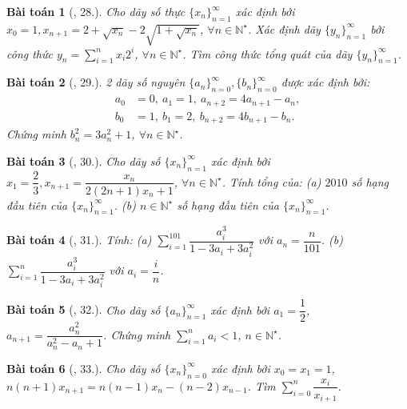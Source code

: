 \documentclass[oneside]{book}
\newtheorem{baitoan}{Bài toán}
\begin{document}
\begin{baitoan}[\cite{TLCT_dai_so_giai_tich_11}, 28.]
	Cho dãy số thực $\{x_n\}_{n=1}^\infty$ xác định bởi $x_0 = 1,x_{n+1} = 2 + \sqrt{x_n} - 2\sqrt{1 + \sqrt{x_n}}$, $\forall n\in\mathbb{N}^\star$. Xác định dãy $\{y_n\}_{n=1}^\infty$ bởi công thức $y_n = \sum_{i=1}^n x_i2^i$, $\forall n\in\mathbb{N}^\star$. Tìm công thức tổng quát của dãy $\{y_n\}_{n=1}^\infty$.
\end{baitoan}

\begin{baitoan}[\cite{TLCT_dai_so_giai_tich_11}, 29.]
	2 dãy số nguyên $\{a_n\}_{n=0}^\infty,\{b_n\}_{n=0}^\infty$ được xác định bởi:
	\begin{align*}
		a_0 &= 0,\ a_1 = 1,\ a_{n+2} = 4a_{n+1} - a_n,\\
		b_0 &= 1,\ b_1 = 2,\ b_{n+2} = 4b_{n+1} - b_n.
	\end{align*}
	Chứng minh $b_n^2 = 3a_n^2 + 1$, $\forall n\in\mathbb{N}^\star$.
\end{baitoan}

\begin{baitoan}[\cite{TLCT_dai_so_giai_tich_11}, 30.]
	Cho dãy số $\{x_n\}_{n=1}^\infty$ xác định bởi $x_1 = \dfrac{2}{3},x_{n+1} = \dfrac{x_n}{2(2n + 1)x_n + 1}$, $\forall n\in\mathbb{N}^\star$. Tính tổng của: (a) $2010$ số hạng đầu tiên của $\{x_n\}_{n=1}^\infty$. (b) $n\in\mathbb{N}^\star$ số hạng đầu tiên của $\{x_n\}_{n=1}^\infty$.
\end{baitoan}

\begin{baitoan}[\cite{TLCT_dai_so_giai_tich_11}, 31.]
	Tính: (a) $\sum_{i=1}^{101} \dfrac{a_i^3}{1 - 3a_i + 3a_i^2}$ với $a_n = \dfrac{n}{101}$. (b) $\sum_{i=1}^n \dfrac{a_i^3}{1 - 3a_i + 3a_i^2}$ với $a_i = \dfrac{i}{n}$.
\end{baitoan}

\begin{baitoan}[\cite{TLCT_dai_so_giai_tich_11}, 32.]
	Cho dãy số $\{a_n\}_{n=1}^\infty$ xác định bởi $a_1 = \dfrac{1}{2}$, $a_{n+1} = \dfrac{a_n^2}{a_n^2 - a_n + 1}$. Chứng minh $\sum_{i=1}^n a_i < 1$, $n\in\mathbb{N}^\star$.
\end{baitoan}

\begin{baitoan}[\cite{TLCT_dai_so_giai_tich_11}, 33.]
	Cho dãy số $\{x_n\}_{n=0}^\infty$ xác định bởi $x_0 = x_1 = 1$,$n(n + 1)x_{n+1} = n(n - 1)x_n - (n - 2)x_{n-1}$. Tìm $\sum_{i=0}^n \dfrac{x_i}{x_{i+1}}$.
\end{baitoan}
\end{document}
